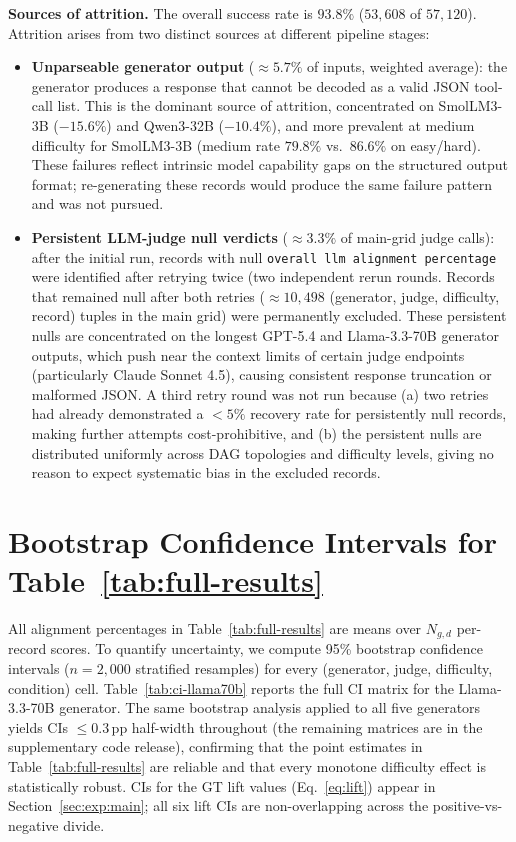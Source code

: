 \textbf{Sources of attrition.} The overall success rate is $93.8\%$ ($53{,}608$ of $57{,}120$). Attrition arises from two distinct sources at different pipeline stages:

\begin{itemize}
  \item \textbf{Unparseable generator output} (${\approx}5.7\%$ of inputs, weighted average): the generator produces a response that cannot be decoded as a valid JSON tool-call list. This is the dominant source of attrition, concentrated on SmolLM3-3B ($-15.6\%$) and Qwen3-32B ($-10.4\%$), and more prevalent at medium difficulty for SmolLM3-3B (medium rate $79.8\%$ vs.\ $86.6\%$ on easy/hard). These failures reflect intrinsic model capability gaps on the structured output format; re-generating these records would produce the same failure pattern and was not pursued.
  \item \textbf{Persistent LLM-judge null verdicts} (${\approx}3.3\%$ of main-grid judge calls): after the initial run, records with null \texttt{overall llm alignment percentage} were identified after retrying twice (two independent rerun rounds. Records that remained null after both retries (${\approx}10{,}498$ (generator, judge, difficulty, record) tuples in the main grid) were permanently excluded. These persistent nulls are concentrated on the longest GPT-5.4 and Llama-3.3-70B generator outputs, which push near the context limits of certain judge endpoints (particularly Claude Sonnet 4.5), causing consistent response truncation or malformed JSON. A third retry round was not run because (a) two retries had already demonstrated a ${<}5\%$ recovery rate for persistently null records, making further attempts cost-prohibitive, and (b) the persistent nulls are distributed uniformly across DAG topologies and difficulty levels, giving no reason to expect systematic bias in the excluded records.
\end{itemize}

\section{Bootstrap Confidence Intervals for Table~\ref{tab:full-results}}
\label{app:bootstrap-ci}

All alignment percentages in Table~\ref{tab:full-results} are means over $N_{g,d}$ per-record scores. To quantify uncertainty, we compute 95\% bootstrap confidence intervals ($n{=}2{,}000$ stratified resamples) for every (generator, judge, difficulty, condition) cell. Table~\ref{tab:ci-llama70b} reports the full CI matrix for the Llama-3.3-70B generator. The same bootstrap analysis applied to all five generators yields CIs $\leq 0.3$\,pp half-width throughout (the remaining matrices are in the supplementary code release), confirming that the point estimates in Table~\ref{tab:full-results} are reliable and that every monotone difficulty effect is statistically robust. CIs for the GT lift values (Eq.~\ref{eq:lift}) appear in Section~\ref{sec:exp:main}; all six lift CIs are non-overlapping across the positive-vs-negative divide.

